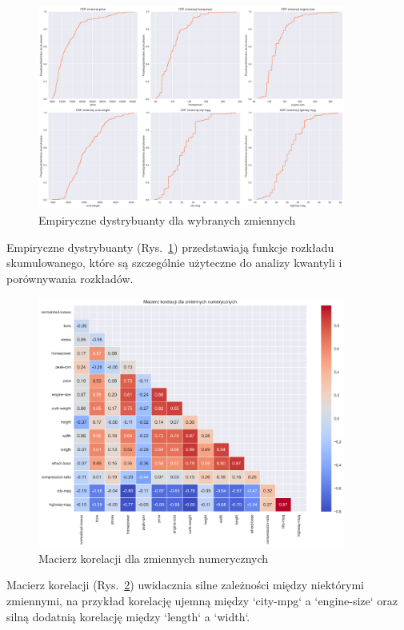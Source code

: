 \documentclass[12pt,a4paper]{article}
\begin{document}
\begin{figure}[H]
    \centering
    \includegraphics[width=0.9\textwidth]{figures/cdf_plots.png}
    \caption{Empiryczne dystrybuanty dla wybranych zmiennych}
    \label{fig:cdf_plots}
\end{figure}

Empiryczne dystrybuanty (Rys.~\ref{fig:cdf_plots}) przedstawiają funkcje rozkładu skumulowanego, które są szczególnie użyteczne do analizy kwantyli i porównywania rozkładów.

\begin{figure}[H]
    \centering
    \includegraphics[width=0.9\textwidth]{figures/correlation_heatmap.png}
    \caption{Macierz korelacji dla zmiennych numerycznych}
    \label{fig:correlation_heatmap}
\end{figure}

Macierz korelacji (Rys.~\ref{fig:correlation_heatmap}) uwidacznia silne zależności między niektórymi zmiennymi, na przykład korelację ujemną między `city-mpg` a `engine-size` oraz silną dodatnią korelację między `length` a `width`.
\end{document}
